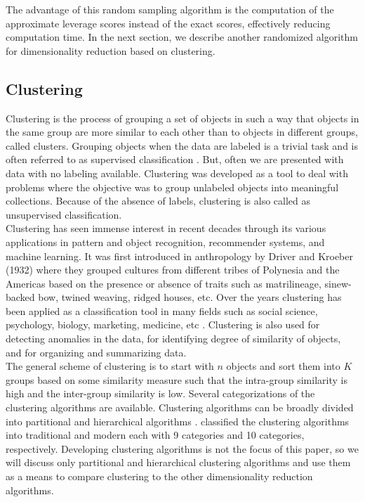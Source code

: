 The advantage of this random sampling algorithm is the computation of the approximate leverage scores instead of the exact scores, effectively reducing computation time. In the next section, we describe another randomized algorithm for dimensionality reduction based on clustering. \\


\subsection{Clustering}
\label{sec:clustering}

Clustering is the process of grouping a set of objects in such a way that objects in the same group are more similar to each other than to objects in different groups, called clusters. Grouping objects when the data are labeled is a trivial task and is often referred to as supervised classification \cite{jain_data_1999}. But, often we are presented with data with no labeling available. Clustering was developed as a tool to deal with problems where the objective was to group unlabeled objects into meaningful collections. Because of the absence of labels, clustering is also called as unsupervised classification. \\

Clustering has seen immense interest in recent decades through its various applications in pattern and object recognition, recommender systems, and machine learning. It was first introduced in anthropology by Driver and Kroeber (1932) where they grouped cultures from different tribes of Polynesia and the Americas based on the presence or absence of traits such as matrilineage, sinew-backed bow, twined weaving, ridged houses, etc. Over the years clustering has been applied as a classification tool in many fields such as social science, psychology, biology, marketing, medicine, etc \cite{Hartigan1975, Punj1983, Jiang2004, Clatworthy2005, Sutherland2012}. Clustering is also used for detecting anomalies in the data, for identifying degree of similarity of objects, and for organizing and summarizing data. \\

The general scheme of clustering is to start with $n$ objects and sort them into $K$ groups based on some similarity measure such that the intra-group similarity is high and the inter-group similarity is low. Several categorizations of the clustering algorithms are available. Clustering algorithms can be broadly divided into partitional and hierarchical algorithms \cite{fraley_model-based_2002}. \cite{xu_comprehensive_2015} classified the clustering algorithms into traditional and modern each with 9 categories and 10 categories, respectively. Developing clustering algorithms is not the focus of this paper, so we will discuss only partitional and hierarchical clustering algorithms and use them as a means to compare clustering to the other dimensionality reduction algorithms. \\

